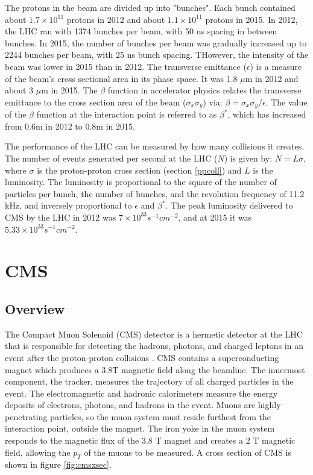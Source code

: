 \documentclass[oneside, letterpaper, oldfontcommands]{memoir}
\begin{document}
\qquad The protons in the beam are divided up into "bunches". Each bunch contained about $1.7 \times 10^{11}$ protons in 2012 and about $1.1 \times 10^{11}$ protons in 2015. In 2012, the LHC ran with 1374 bunches per beam, with 50 ns spacing in between bunches. In 2015, the number of bunches per beam was gradually increased up to 2244 bunches per beam, with 25 ns bunch spacing. THowever, the intensity of the beam was lower in 2015 than in 2012. The transverse emittance ($\epsilon$) is a measure of the beam's cross sectional area in its phase space. It was 1.8 $\mu$m in 2012 and about 3 $\mu$m in 2015. The $\beta$ function in accelerator physics relates the transverse emittance to the cross section area of the beam ($\sigma_{x}\sigma_{y}$) via: $ \beta	= \sigma_{x}\sigma_{y} / \epsilon$. The value of the $\beta$ function at the interaction point is referred to as $\beta^{*}$, which has increased from 0.6m in 2012 to 0.8m in 2015.

\qquad The performance of the LHC can be measured by how many collisions it creates. The number of events generated per second at the LHC ($N$) is given by: $N = L\sigma$, where $\sigma$ is the proton-proton cross section (section \ref{ppcoll}) and $L$ is the luminosity. The luminosity is proportional to the square of the number of particles per bunch, the number of bunches, and the revolution frequency of 11.2 kHz, and inversely proportional to $\epsilon$ and $\beta^{*}$. The peak luminosity delivered to CMS by the LHC in 2012 was $7 \times 10^{33} s^{-1} cm^{-2}$, and at 2015 it was $5.33 \times 10^{33} s^{-1} cm^{-2}$. 


\section{CMS}\label{cms}
\subsection{Overview}

\qquad The Compact Muon Solenoid (CMS) detector is a hermetic detector at the LHC that is responsible for detecting the hadrons, photons, and charged leptons in an event after the proton-proton collisions \cite{1748-0221-3-08-S08001}. CMS contains a superconducting magnet which produces a 3.8T magnetic field along the beamline. The innermost component, the tracker, measures the trajectory of all charged particles in the event. The electromagnetic and hadronic calorimeters measure the energy deposits of electrons, photons, and hadrons in the event. Muons are highly penetrating particles, so the muon system must reside furthest from the interaction point, outside the magnet. The iron yoke in the muon system responds to the magnetic flux of the 3.8 T magnet and creates a 2 T magnetic field, allowing the $p_{T}$ of the muons to be measured. A cross section of CMS is shown in figure \ref{fig:cmsxsec}. 
\end{document}
